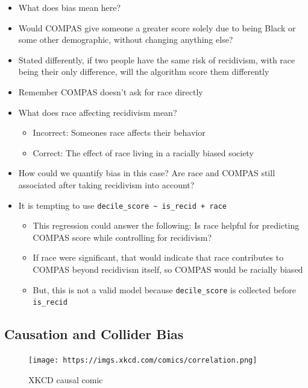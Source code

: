 \documentclass[
]{article}
\providecommand{\tightlist}{%
  \setlength{\itemsep}{0pt}\setlength{\parskip}{0pt}}
\begin{document}
\begin{itemize}
\item
  What does bias mean here?
\item
  Would COMPAS give someone a greater score solely due to being Black or
  some other demographic, without changing anything else?
\item
  Stated differently, if two people have the same risk of recidivism,
  with race being their only difference, will the algorithm score them
  differently
\item
  Remember COMPAS doesn't ask for race directly
\item
  What does race affecting recidivism mean?

  \begin{itemize}
  \tightlist
  \item
    Incorrect: Someones race affects their behavior
  \item
    Correct: The effect of race living in a racially biased society
  \end{itemize}
\item
  How could we quantify bias in this case? Are race and COMPAS still
  associated after taking recidivism into account?
\item
  It is tempting to use
  \texttt{decile\_score\ \textasciitilde{}\ is\_recid\ +\ race}

  \begin{itemize}
  \tightlist
  \item
    This regression could answer the following: Is race helpful for
    predicting COMPAS score while controlling for recidivism?
  \item
    If race were significant, that would indicate that race contributes
    to COMPAS beyond recidivism itself, so COMPAS would be racially
    biased
  \item
    But, this is not a valid model because \texttt{decile\_score} is
    collected before \texttt{is\_recid}
  \end{itemize}
\end{itemize}

\hypertarget{causation-and-collider-bias}{%
\subsection{Causation and Collider
Bias}\label{causation-and-collider-bias}}

\begin{figure}
\centering
\texttt{[image: https://imgs.xkcd.com/comics/correlation.png]}
\caption{XKCD causal comic}
\end{figure}
\end{document}
